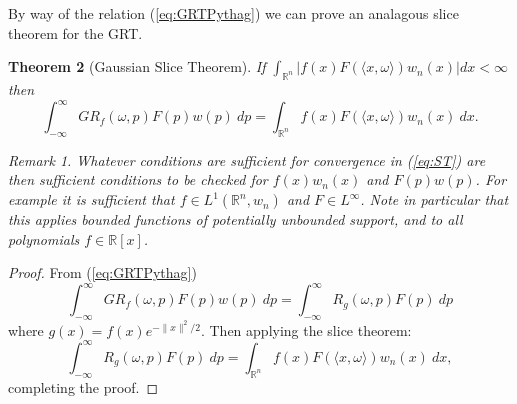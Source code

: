 \documentclass{amsart}
\newtheorem{theorem}{Theorem}[section]
\theoremstyle{remark}
\newtheorem{remark}[theorem]{Remark}
\numberwithin{equation}{section}
\newcommand{\RR}{\mathbb{R}}
\begin{document}
By way of the relation (\ref{eq:GRTPythag}) we can prove an analagous slice theorem for the GRT.\@
\begin{theorem}[Gaussian Slice Theorem] If $\int_{\mathbb{R}^n} |f(x) F(\langle x, \omega\rangle) w_n(x)| dx < \infty$ then
\begin{equation}\label{eq:GST}
    \int_{-\infty}^\infty GR_f(\omega, p)F(p) w(p) ~dp
    = \int_{\mathbb{R}^n}f(x) F(\langle x, \omega\rangle) w_n(x) ~dx. 
\end{equation}
\begin{remark}
Whatever conditions are sufficient for convergence in (\ref{eq:ST}) are then sufficient conditions to be checked for $f(x)w_n(x)$ and $F(p)w(p)$. For example it is sufficient that $f \in L^1(\RR^n, w_n)$ and $F \in L^\infty$. Note in particular that this applies bounded functions of potentially unbounded support, and to all polynomials $f \in \RR[x]$.
\end{remark}
\end{theorem}
\begin{proof}
From (\ref{eq:GRTPythag})
\[
    \int_{-\infty}^\infty GR_f(\omega, p)F(p) w(p) ~dp 
    = \int_{-\infty}^\infty R_g(\omega, p) F(p) ~dp
\]
where $g(x) = f(x)e^{-\|x\|^2/2}$. Then applying the slice theorem:
\[
    \int_{-\infty}^\infty R_g(\omega, p) F(p) ~dp 
    = \int_{\RR^n} f(x)F(\langle x, \omega \rangle) w_n(x) ~dx,
\]
completing the proof.
\end{proof}

\end{document}
